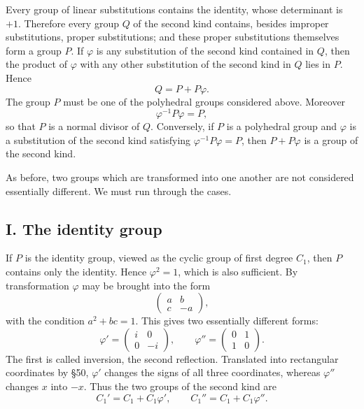 \documentclass[11pt,a4paper]{book}
\begin{document}
Every group of linear substitutions contains the identity, whose determinant is \(+1\).  Therefore every group \(Q\) of the second kind contains, besides improper substitutions, proper substitutions; and these proper substitutions themselves form a group \(P\).  If \(\varphi\) is any substitution of the second kind contained in \(Q\), then the product of \(\varphi\) with any other substitution of the second kind in \(Q\) lies in \(P\).  Hence
\begin{equation}\label{eq:62-1}
 Q=P+P\varphi.
\end{equation}
The group \(P\) must be one of the polyhedral groups considered above.  Moreover
\[
 \varphi^{-1}P\varphi=P,
\]
so that \(P\) is a normal divisor of \(Q\).  Conversely, if \(P\) is a polyhedral group and \(\varphi\) is a substitution of the second kind satisfying \(\varphi^{-1}P\varphi=P\), then \(P+P\varphi\) is a group of the second kind.

As before, two groups which are transformed into one another are not considered essentially different.  We must run through the cases.

\subsection*{I. The identity group}

If \(P\) is the identity group, viewed as the cyclic group of first degree \(C_1\), then \(P\) contains only the identity.  Hence \(\varphi^2=1\), which is also sufficient.  By transformation \(\varphi\) may be brought into the form
\[
 \begin{pmatrix}a&b\\c&-a\end{pmatrix},
\]
with the condition \(a^2+bc=1\).  This gives two essentially different forms:
\begin{equation}\label{eq:62-2}
 \varphi'=\begin{pmatrix}i&0\\0&-i\end{pmatrix},
 \qquad
 \varphi''=\begin{pmatrix}0&1\\1&0\end{pmatrix}.
\end{equation}
The first is called inversion, the second reflection.  Translated into rectangular coordinates by \S 50, \(\varphi'\) changes the signs of all three coordinates, whereas \(\varphi''\) changes \(x\) into \(-x\).  Thus the two groups of the second kind are
\[
 C_1'=C_1+C_1\varphi',
 \qquad
 C_1''=C_1+C_1\varphi''.
\]
\end{document}
